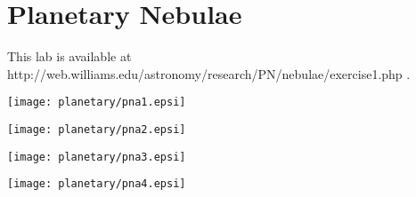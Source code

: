 \chapter{Planetary Nebulae}

This lab is available at http://web.williams.edu/astronomy/research/PN/nebulae/exercise1.php .


\texttt{[image: planetary/pna1.epsi]}

\texttt{[image: planetary/pna2.epsi]}

\texttt{[image: planetary/pna3.epsi]}

\vfil\eject

\texttt{[image: planetary/pna4.epsi]}
\vfil\eject
